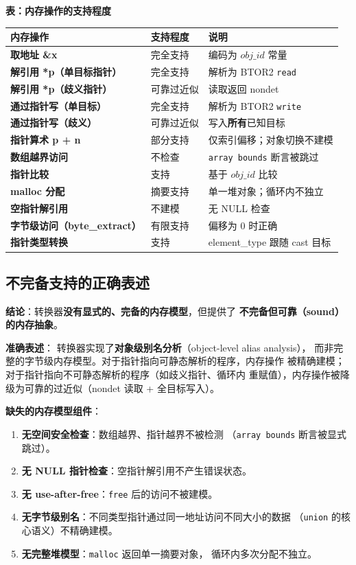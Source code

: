 \documentclass[11pt,a4paper]{article}
\begin{document}
\begin{center}
\textbf{表：内存操作的支持程度}
\end{center}
\renewcommand{\arraystretch}{1.3}
\begin{tabular}{>{\bfseries}l l l}
  \toprule
  内存操作 & 支持程度 & 说明 \\
  \midrule
  取地址 \&x & 完全支持 & 编码为 $\mathit{obj\_id}$ 常量 \\
  解引用 *p（单目标指针） & 完全支持 & 解析为 BTOR2 \texttt{read} \\
  解引用 *p（歧义指针） & 可靠过近似 & 读取返回 nondet \\
  通过指针写（单目标） & 完全支持 & 解析为 BTOR2 \texttt{write} \\
  通过指针写（歧义） & 可靠过近似 & 写入\textbf{所有}已知目标 \\
  指针算术 p + n & 部分支持 & 仅索引偏移；对象切换不建模 \\
  数组越界访问 & 不检查 & \texttt{array bounds} 断言被跳过 \\
  指针比较 & 支持 & 基于 $\mathit{obj\_id}$ 比较 \\
  malloc 分配 & 摘要支持 & 单一堆对象；循环内不独立 \\
  空指针解引用 & 不建模 & 无 NULL 检查 \\
  字节级访问（byte\_extract） & 有限支持 & 偏移为 0 时正确 \\
  指针类型转换 & 支持 & element\_type 跟随 cast 目标 \\
  \bottomrule
\end{tabular}

\subsection{不完备支持的正确表述}

\textbf{结论}：转换器\textbf{没有显式的、完备的内存模型}，但提供了
\textbf{不完备但可靠（sound）的内存抽象}。

\begin{shaded*}
\textbf{准确表述}：
转换器实现了\textbf{对象级别名分析}（object-level alias analysis），
而非完整的字节级内存模型。对于指针指向可静态解析的程序，内存操作
被精确建模；对于指针指向不可静态解析的程序（如歧义指针、循环内
重赋值），内存操作被降级为可靠的过近似（nondet 读取 + 全目标写入）。
\end{shaded*}

\textbf{缺失的内存模型组件}：
\begin{enumerate}
  \item \textbf{无空间安全检查}：数组越界、指针越界不被检测
        （\texttt{array bounds} 断言被显式跳过）。
  \item \textbf{无 NULL 指针检查}：空指针解引用不产生错误状态。
  \item \textbf{无 use-after-free}：\texttt{free} 后的访问不被建模。
  \item \textbf{无字节级别名}：不同类型指针通过同一地址访问不同大小的数据
        （\texttt{union} 的核心语义）不精确建模。
  \item \textbf{无完整堆模型}：\texttt{malloc} 返回单一摘要对象，
        循环内多次分配不独立。
\end{enumerate}
\end{document}
